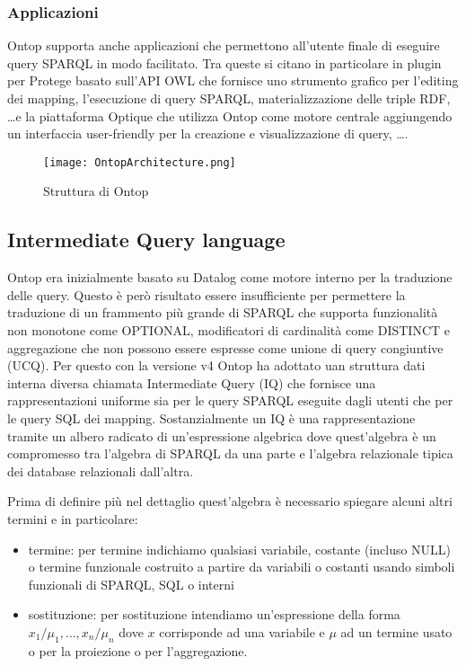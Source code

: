 \subsubsection*{Applicazioni}
Ontop supporta anche applicazioni che permettono all'utente finale di eseguire query SPARQL in modo facilitato. Tra queste si citano in particolare in plugin per Protege basato sull'API OWL 
che fornisce uno strumento grafico per l'editing dei mapping, l'esecuzione di query SPARQL, materializzazione delle triple RDF, \dots e la piattaforma Optique che utilizza Ontop come motore centrale 
aggiungendo un interfaccia user-friendly per la creazione e visualizzazione di query, \dots .

\begin{figure}[ht]
    \centering
    \texttt{[image: OntopArchitecture.png]}
    \caption{Struttura di Ontop}
    \label{fig:OntopArchitecture}
\end{figure}

\subsection{Intermediate Query language}
\label{sec:ontop_iq}
Ontop era inizialmente basato su Datalog come motore interno per la traduzione delle query. Questo è però risultato essere insufficiente per permettere la traduzione di un frammento più grande di SPARQL 
che supporta funzionalità non monotone come OPTIONAL, modificatori di cardinalità come DISTINCT e aggregazione che non possono essere espresse come unione di query congiuntive (UCQ). Per questo con la versione
v4 Ontop ha adottato uan struttura dati interna diversa chiamata Intermediate Query (IQ) che fornisce una rappresentazioni uniforme sia per le query SPARQL eseguite dagli utenti che per le query SQL dei mapping.
Sostanzialmente un IQ è una rappresentazione tramite un albero radicato di un'espressione algebrica dove quest'algebra è un compromesso tra l'algebra di SPARQL da una parte e l'algebra relazionale tipica dei database 
relazionali dall'altra.

Prima di definire più nel dettaglio quest'algebra è necessario spiegare alcuni altri termini e in particolare:
\begin{itemize}
    \item termine: per termine indichiamo qualsiasi variabile, costante (incluso NULL) o termine funzionale costruito a partire da variabili o costanti usando simboli funzionali di SPARQL, SQL o interni
    \item sostituzione: per sostituzione intendiamo un'espressione della forma \linebreak
        $x_1/\mu_1 , \dots , x_n/\mu_n $ dove $x$ corrisponde ad una variabile e $\mu$ ad un termine usato o per la proiezione o per l'aggregazione.
\end{itemize} \cite{Ontop}

